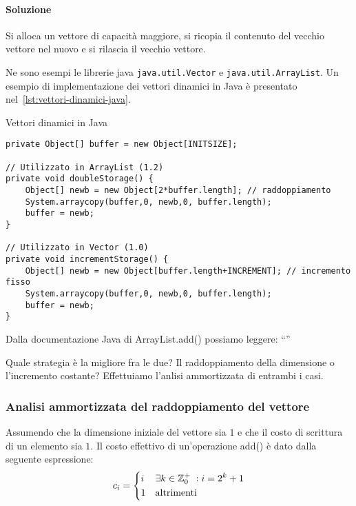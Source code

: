 \paragraph{Soluzione}
Si alloca un vettore di capacità maggiore, si ricopia il contenuto del vecchio vettore nel nuovo e si rilascia il vecchio vettore.

Ne sono esempi le librerie java \texttt{java.util.Vector} e \texttt{java.util.ArrayList}.
Un esempio di implementazione dei vettori dinamici in Java è presentato nel~\cref{lst:vettori-dinamici-java}.

\begin{listing}[H]
\caption{Vettori dinamici in Java}\label{lst:vettori-dinamici-java}
\begin{verbatim}
private Object[] buffer = new Object[INITSIZE];

// Utilizzato in ArrayList (1.2)
private void doubleStorage() {
    Object[] newb = new Object[2*buffer.length]; // raddoppiamento
    System.arraycopy(buffer,0, newb,0, buffer.length);
    buffer = newb;
}

// Utilizzato in Vector (1.0)
private void incrementStorage() {
    Object[] newb = new Object[buffer.length+INCREMENT]; // incremento fisso
    System.arraycopy(buffer,0, newb,0, buffer.length);
    buffer = newb;
}
\end{verbatim}
\end{listing}

Dalla documentazione Java di \textsf{ArrayList.add()} possiamo leggere:
\enquote{}

Quale strategia è la migliore fra le due?
Il raddoppiamento della dimensione o l'incremento costante?
Effettuiamo l'anlisi ammortizzata di entrambi i casi.

\subsubsection{Analisi ammortizzata del raddoppiamento del vettore}

Assumendo che la dimensione iniziale del vettore sia \(1\) e che il costo di scrittura di un elemento sia \(1\).
Il costo effettivo di un'operazione \textsf{add()} è dato dalla seguente espressione:
\[
    c_i =
    \begin{dcases}
        i & \exists k \in \mathbb{Z}_{0}^{+}\; : i = 2^k + 1\\
        1 & \text{altrimenti}\\
    \end{dcases}
\]

